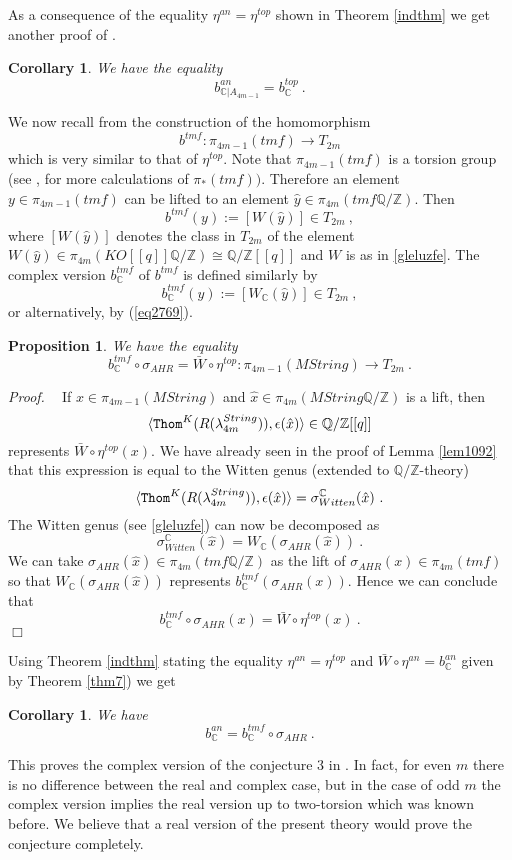 \documentclass[12pt]{article}
\newtheorem{prop}[theorem]{Proposition}
\newtheorem{kor}[theorem]{Corollary}
\newcommand{\tmf}{{tmf}}
\newcommand{\Thom}{{\tt Thom}}
\def\hB{\hspace*{\fill}$\Box$ \newline\noindent}
\newcommand{\proof}{{\it Proof.$\:\:\:\:$}}
\newcommand{\Z}{{\mathbb{Z}}}
\newcommand{\Q}{{\mathbb{Q}}}
\newcommand{\C}{{\mathbb{C}}}
\begin{document}
As a consequence of the equality $\eta^{an}=\eta^{top}$ shown in Theorem \ref{indthm}
we get another proof of \cite[Thm. 2.2]{2009arXiv0912.4875B}. \begin{kor}
We have the equality
$$b^{an}_{\C|A_{4m-1}}=b_{\C}^{top}\ .$$
\end{kor}



 

We now recall  from  \cite[Sec.4.3]{2009arXiv0912.4875B} the construction of  the homomorphism
$$b^{\tmf}:\pi_{4m-1}(\tmf)\to T_{2m}$$
which is very similar to that of $\eta^{top}$.
Note that $\pi_{4m-1}(\tmf)$ is a torsion group (see \cite{MR1989190}, \cite{MR2508200} for more calculations of $\pi_{*}(\tmf))$. Therefore an element $y\in \pi_{4m-1}(\tmf)$ can be lifted to an element
$\hat y\in \pi_{4m}(\tmf \Q/\Z)$. Then
$$b^{\tmf}(y):=[W(\hat y)]\in T_{2m}\ ,$$
where $[W(\hat y)]$ denotes the class in $T_{2m}$ of the element
$W(\hat y)\in \pi_{4m}(KO[[q]]\Q/\Z)\cong \Q/\Z[[q]]$ and $W$ is as in \eqref{gleluzfe}.
The complex version  $b_{\C}^{\tmf}$ of $b^{\tmf}$ is defined similarly by
$$b_{\C}^{\tmf}(y):=[W_{\C}(\hat y)]\in T_{2m}\ ,$$
or alternatively, by (\ref{eq2769}).

\begin{prop}
We have the equality
$$b_{\C}^{\tmf}\circ \sigma_{AHR}=\bar W\circ \eta^{top}:\pi_{4m-1}(MString)\to T_{2m}\ .$$
\end{prop}
\proof
If $x\in \pi_{4m-1}(MString)$ and $\hat x\in \pi_{4m}(MString\Q/\Z)$ is a lift, then
$$\langle \Thom^{K}(R(\lambda^{String}_{4m})), \epsilon(\hat x)\rangle\in \Q/\Z[[q]]$$ represents
$\bar W\circ \eta^{top}(x)$. We have already seen in the proof of Lemma \ref{lem1092} that this expression is equal to the Witten genus (extended to $\Q/\Z$-theory)
$$\langle\Thom^{K}(R(\lambda^{String}_{4m})), \epsilon(\hat x)\rangle=\sigma^{\C}_{Witten}(\hat x)\ .$$
The Witten genus (see \eqref{gleluzfe}) can now be decomposed as
$$\sigma^{\C}_{Witten} (\hat x)=W_{\C}(\sigma_{AHR}(\hat x))\ .$$
We can take $\sigma_{AHR}(\hat x)\in \pi_{4m}(\tmf\Q/\Z)$ as the lift of $\sigma_{AHR}(x)\in \pi_{4m}(\tmf)$ so that 
$W_{\C}(\sigma_{AHR}(\hat x))$ represents  $b_{\C}^{\tmf}(\sigma_{AHR}(x))$.
Hence we can conclude that
$$b_{\C}^{\tmf}\circ \sigma_{AHR}(x)=\bar W\circ \eta^{top}(x)\ .$$
\hB


  Using   Theorem \ref{indthm}  stating  the equality $\eta^{an}=\eta^{top}$ and $\bar W\circ \eta^{an}=b_{\C}^{an}$ given by Theorem \ref{thm7}) we get
\begin{kor}\label{thm7v}
We have
$$b^{an}_{\C}= b_{\C}^{\tmf}\circ \sigma_{AHR}\ .$$
\end{kor}
This proves the complex version of the conjecture 3 in 
 \cite[Sec 1.5]{2009arXiv0912.4875B}. 
 In fact, for even $m$ there is no difference between the real and complex case, but
 in the case of odd $m$ the complex version implies the real version up to two-torsion which was known before.
 We believe  that a real version of the present theory would prove the conjecture 
 completely.
 
\end{document}
